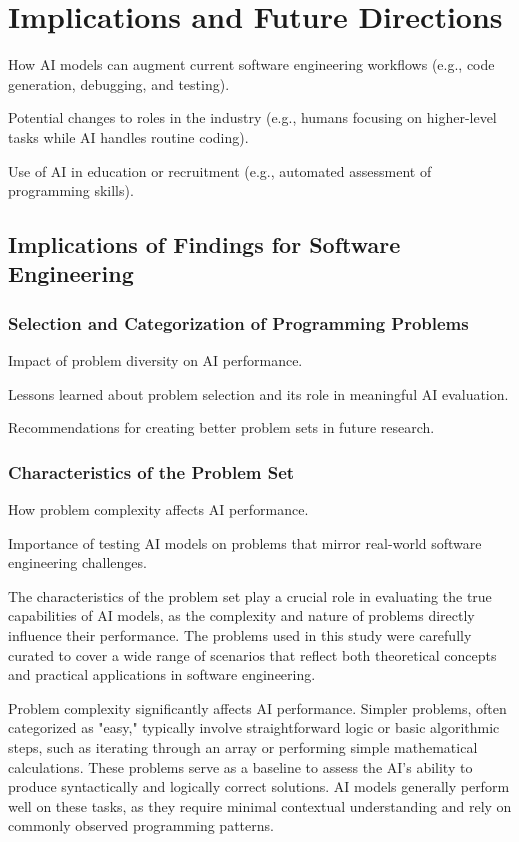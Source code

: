 
\section{Implications and Future Directions}

How AI models can augment current software engineering workflows (e.g., code generation, debugging, and testing).

Potential changes to roles in the industry (e.g., humans focusing on higher-level tasks while AI handles routine coding).

Use of AI in education or recruitment (e.g., automated assessment of programming skills).

\subsection{Implications of Findings for Software Engineering}

\subsubsection{Selection and Categorization of Programming Problems}

Impact of problem diversity on AI performance.

Lessons learned about problem selection and its role in meaningful AI evaluation.

Recommendations for creating better problem sets in future research.

\subsubsection{Characteristics of the Problem Set}

How problem complexity affects AI performance.

Importance of testing AI models on problems that mirror real-world software engineering challenges.

The characteristics of the problem set play a crucial role in evaluating the true capabilities of AI models, as the complexity and nature of problems directly influence their performance. The problems used in this study were carefully curated to cover a wide range of scenarios that reflect both theoretical concepts and practical applications in software engineering.

Problem complexity significantly affects AI performance. Simpler problems, often categorized as "easy," typically involve straightforward logic or basic algorithmic steps, such as iterating through an array or performing simple mathematical calculations. These problems serve as a baseline to assess the AI's ability to produce syntactically and logically correct solutions. AI models generally perform well on these tasks, as they require minimal contextual understanding and rely on commonly observed programming patterns.

